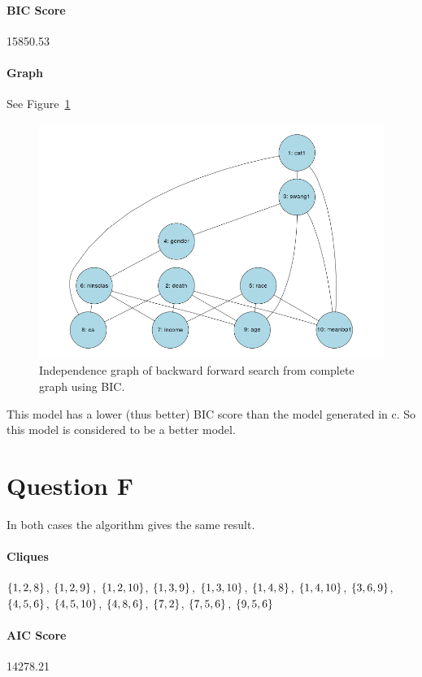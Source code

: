 \documentclass[12pt]{article}
\theoremstyle{definition}
\begin{document}
\paragraph{BIC Score} 15850.53

\paragraph{Graph} See Figure~\ref{fig:e}

\begin{figure}[H]
    \centering
    \includegraphics[width=0.8\linewidth]{e.png}
    \caption{Independence graph of backward forward search from complete graph using BIC.}
\label{fig:e}
\end{figure}

This model has a lower (thus better) BIC score than the model generated in c.
So this model is considered to be a better model.

\section*{Question F}
In both cases the algorithm gives the same result.

\paragraph{Cliques}
$\set{1,2,8}$, $\set{1,2,9}$, $\set{1,2,10}$, $\set{1,3,9}$, $\set{1,3,10}$, $\set{1,4,8}$,
$\set{1,4,10}$, $\set{3,6,9}$, $\set{4,5,6}$, $\set{4,5,10}$, $\set{4,8,6}$, $\set{7,2}$,
$\set{7,5,6}$, $\set{9,5,6}$

\paragraph{AIC Score} 14278.21
\end{document}
